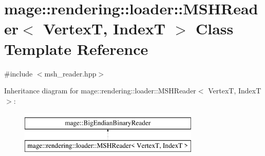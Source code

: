 \hypertarget{classmage_1_1rendering_1_1loader_1_1_m_s_h_reader}{}\section{mage\+:\+:rendering\+:\+:loader\+:\+:M\+S\+H\+Reader$<$ VertexT, IndexT $>$ Class Template Reference}
\label{classmage_1_1rendering_1_1loader_1_1_m_s_h_reader}


{\ttfamily \#include $<$msh\+\_\+reader.\+hpp$>$}

Inheritance diagram for mage\+:\+:rendering\+:\+:loader\+:\+:M\+S\+H\+Reader$<$ VertexT, IndexT $>$\+:\begin{figure}[H]
\begin{center}
\leavevmode
\includegraphics[height=2.000000cm]{classmage_1_1rendering_1_1loader_1_1_m_s_h_reader}
\end{center}
\end{figure}
